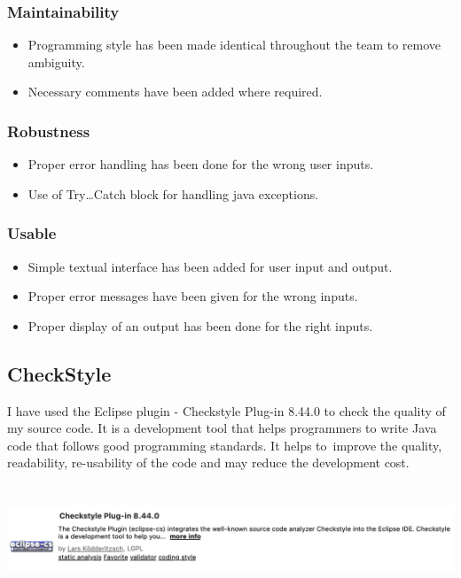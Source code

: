 \documentclass[a4paper,12pt]{article}
\begin{document}
    \subsubsection{Maintainability}
    \begin{itemize}
        \item Programming style has been made identical throughout the team to remove ambiguity.
        \item Necessary comments have been added where required.
    \end{itemize}
    
    \subsubsection{Robustness}
    \begin{itemize}
        \item Proper error handling has been done for the wrong user inputs.
        \item Use of Try…Catch block for handling java exceptions.
    \end{itemize}
    
    \subsubsection{Usable}
    \begin{itemize}
        \item Simple textual interface has been added for user input and output.
        \item Proper error messages have been given for the wrong inputs.
        \item Proper display of an output has been done for the right inputs.
    \end{itemize}
    
    \newpage
    
    \subsection{CheckStyle}
    I have used the Eclipse plugin - Checkstyle Plug-in 8.44.0 to check the quality of my source code. It is a development tool that helps programmers to write Java code that follows good programming standards. It helps to improve the quality, readability, re-usability of the code and may reduce the development cost.\\
    \includegraphics[width=16cm, height=4cm]{check_style.png}
\end{document}
